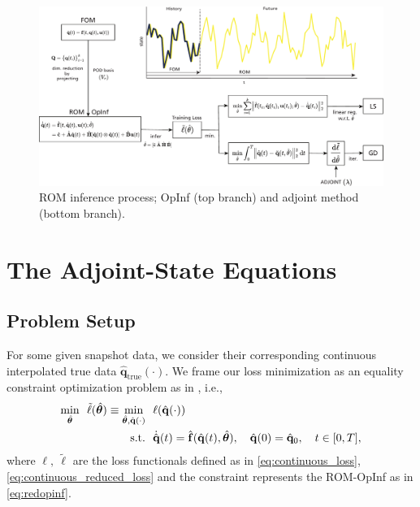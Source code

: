 \vspace{0.3cm}

\begin{figure}[h!]\centering
    \includegraphics[width=.99\textwidth]{figures/intro_scheme.pdf}
    \caption{ROM inference process; OpInf (top branch) and adjoint method (bottom branch).}
    \label{fig:intro_rom1}
\end{figure}



\newpage

\section{The Adjoint-State Equations}
\label{sec:adjoint_eqs}

\subsection*{Problem Setup}

For some given snapshot data, we consider their corresponding continuous interpolated true data $\hat{\mathbf{q}}_{\text{true}}(\cdot)$. We frame our loss minimization as an equality constraint optimization problem as in \cite{bradley2024pde}, i.e.,\\
\begin{align}
    \underset{\hat{\bm{\theta}}}{\mathrm{min}}~~\tilde\ell (\hat{\bm{\theta}})\equiv\underset{\hat{\bm{\theta}},\hat{\mathbf{q}}(\cdot)}{\mathrm{min}} ~~&\ell (\hat{\mathbf{q}}(\cdot))\notag\\
    \mathrm{s.t.}~~&\dot{\hat{\mathbf{q}}}(t) = \hat{\mathbf{f}}(\hat{\mathbf{q}}(t),\hat{\bm{\theta}}), \quad\hat{\mathbf{q}}(0)=\hat{\mathbf{q}}_0, \quad t\in[0,T],
    \label{eq:opt_problem}
\end{align}
where $\ell,~\tilde{\ell}$ are the loss functionals defined as in \eqref{eq:continuous_loss}, \eqref{eq:continuous_reduced_loss} and the constraint represents the ROM-OpInf as in \eqref{eq:redopinf}.

